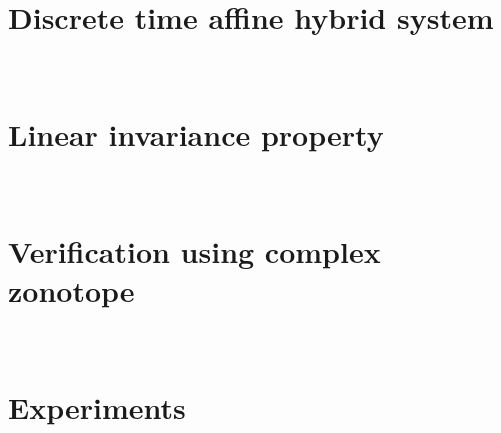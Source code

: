 \section{Discrete time affine hybrid system}~\label{sec:hybrid-system}


\section{Linear invariance property}~\label{sec:linear-invariance}


\section{Verification using complex zonotope}~\label{sec:verification-invariance}


\section{Experiments}~\label{sec:acz-exp}



